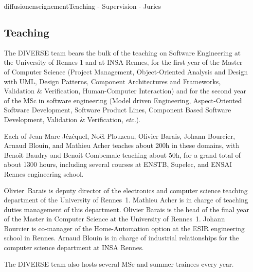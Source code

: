 \documentclass{ra2018}
\newcommand{\team}{DIVERSE}
\begin{document}
\begin{module}{diffusion}{enseignement}{Teaching - Supervision - Juries}

\subsection {Teaching}


 The \team{} team bears the bulk of the teaching on Software Engineering at the 
 University of Rennes 1 and at INSA Rennes, for the first year of the Master of Computer Science
 (Project Management, Object-Oriented Analysis and Design with UML, Design Patterns, 
 Component Architectures and Frameworks, Validation \& Verification, Human-Computer Interaction) 
 and for the second year of the MSc in software engineering (Model driven Engineering, Aspect-Oriented Software Development, 
 Software Product Lines, Component Based Software Development, Validation \& Verification, \textit{etc.}). 
 
 Each of Jean-Marc J\'{e}z\'{e}quel, No\"el Plouzeau, Olivier Barais, Johann Bourcier, 
 Arnaud Blouin, and Mathieu Acher teaches about 200h in these domains, 
 with Benoit Baudry and Benoit Combemale teaching about 50h, 
 for a grand total of about 1300 hours, including several courses at ENSTB, Supelec, 
 and ENSAI Rennes engineering school.
 
Olivier~Barais is deputy director of the electronics and computer science teaching department of the University of Rennes~1.
 Mathieu Acher is in charge of teaching duties management of this department. 
Olivier Barais is the head of the final year of the Master in Computer Science at the University of Rennes~1.
Johann Bourcier is co-manager of the Home-Automation option at the ESIR engineering school in Rennes.
Arnaud Blouin is in charge of industrial relationships for the computer science department at INSA Rennes.
 
 The \team{} team also hosts several MSc and summer trainees every year.


%


\end{module}
\end{document}
